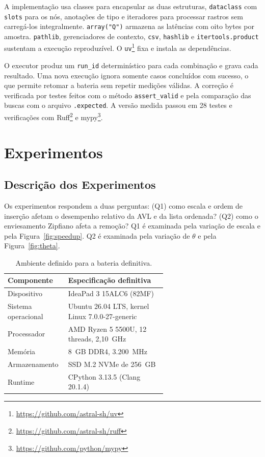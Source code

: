 \documentclass[12pt]{article}
\begin{document}
{A implementação usa classes para encapsular as duas estruturas, \texttt{dataclass} com \texttt{slots} para os nós, anotações de tipo e iteradores para processar rastros sem carregá-los integralmente. \texttt{array("Q")} armazena as latências com oito bytes por amostra. \texttt{pathlib}, gerenciadores de contexto, \texttt{csv}, \texttt{hashlib} e \texttt{itertools.product} sustentam a execução reproduzível. O \texttt{uv}\footnote{\url{https://github.com/astral-sh/uv}} fixa e instala as dependências.}

{O executor produz um \texttt{run\_id} determinístico para cada combinação e grava cada resultado. Uma nova execução ignora somente casos concluídos com sucesso, o que permite retomar a bateria sem repetir medições válidas. A correção é verificada por testes feitos com o método \texttt{assert\_valid} e pela comparação das buscas com o arquivo \texttt{.expected}. A versão medida passou em 28 testes e verificações com Ruff\footnote{\url{https://github.com/astral-sh/ruff}} e mypy\footnote{\url{https://github.com/python/mypy}}.}

\section{{Experimentos}}\label{sec:experiments}

\subsection{{Descrição dos Experimentos}}\label{sec:experiments:description}

{Os experimentos respondem a duas perguntas: (Q1) como escala e ordem de inserção afetam o desempenho relativo da AVL e da lista ordenada? (Q2) como o enviesamento Zipfiano afeta a remoção? Q1 é examinada pela variação de escala e pela Figura~\ref{fig:speedup}. Q2 é examinada pela variação de $\theta$ e pela Figura~\ref{fig:theta}.}

\begin{table}[!ht]
\centering
\small
\caption{{Ambiente definido para a bateria definitiva.}}
\label{tab:testbed}
\begin{tabular}{lp{0.62\linewidth}}
\hline
{Componente} & {Especificação definitiva} \\
\hline
{Dispositivo} & {IdeaPad 3 15ALC6 (82MF)} \\
{Sistema operacional} & {Ubuntu 26.04 LTS, kernel Linux 7.0.0-27-generic} \\
{Processador} & {AMD Ryzen 5 5500U, 12 threads, 2,10~GHz} \\
{Memória} & {8~GB DDR4, 3.200~MHz} \\
{Armazenamento} & {SSD M.2 NVMe de 256~GB} \\
{Runtime} & {CPython 3.13.5 (Clang 20.1.4)} \\
\hline
\end{tabular}
\end{table}
\end{document}
